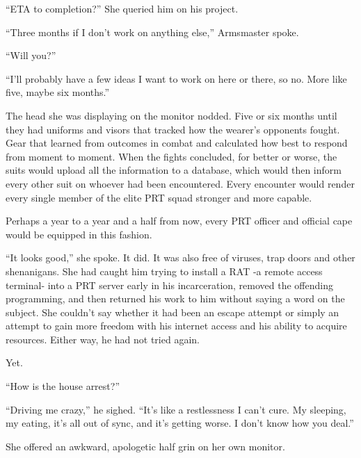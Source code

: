 ``ETA to completion?''  She queried him on his project.



``Three months if I don't work on anything else,'' Armsmaster spoke.



``Will you?''



``I'll probably have a few ideas I want to work on here or there, so no.  More like five, maybe six months.''



The head she was displaying on the monitor nodded.  Five or six months until they had uniforms and visors that tracked how the wearer's opponents fought.  Gear that learned from outcomes in combat and calculated how best to respond from moment to moment.  When the fights concluded, for better or worse, the suits would upload all the information to a database, which would then inform every other suit on whoever had been encountered.  Every encounter would render every single member of the elite PRT squad stronger and more capable.



Perhaps a year to a year and a half from now, every PRT officer and official cape would be equipped in this fashion.



``It looks good,'' she spoke.  It did.  It was also free of viruses, trap doors and other shenanigans.  She had caught him trying to install a RAT -a remote access terminal- into a PRT server early in his incarceration, removed the offending programming, and then returned his work to him without saying a word on the subject.  She couldn't say whether it had been an escape attempt or simply an attempt to gain more freedom with his internet access and his ability to acquire resources.  Either way, he had not tried again.



Yet.



``How is the house arrest?''



``Driving me crazy,'' he sighed.  ``It's like a restlessness I can't cure.  My sleeping, my eating, it's all out of sync, and it's getting worse.  I don't know how you deal.''



She offered an awkward, apologetic half grin on her own monitor.



